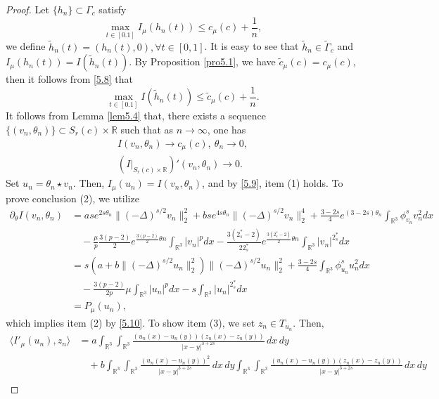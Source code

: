 \documentclass[reqno]{amsart}
\begin{document}
\begin{proof}
Let $\{h_n\}\subset \Gamma_c$ satisfy 
\begin{equation}\label{5.8}
\max_{t\in[0.1]}I_\mu(h_n(t))\leq {c}_\mu(c)+\frac{1}{n},
\end{equation}
we define $\tilde{h}_n(t)=(h_n(t) , 0), \forall t\in[0,1]$. 
It is easy to see that $\tilde{h}_n \in \tilde{\Gamma}_c$ and 
$I_\mu(h_n(t))=I(\tilde{h}_n(t))$. By Proposition \ref{pro5.1}, we have 
$\tilde{c}_\mu(c)={c}_\mu(c)$, then it follows from \eqref{5.8} that
\[  %
\max_{t\in[0.1]}I(\tilde{h}_n(t))\leq \tilde{c}_\mu(c)+\frac{1}{n}.
\]
It follows from Lemma \ref{lem5.4} that, there exists a sequence
$\{(v_n, \theta_n)\} \subset S_{r}(c)\times \mathbb{R}$ such that as $n\to \infty$,
one has
\begin{gather}\label{5.9}
I(v_n, \theta_n)\to c_\mu(c), ~\theta_n\to 0, \\
\label{5.10}
(I|_{S_{r}(c)\times{\mathbb{R}}})'(v_n, \theta_n)\to 0.
\end{gather}
Set $u_n=\theta_n \star  v_n$. Then, $I_\mu(u_n)=I(v_n, \theta_n)$,
and by \eqref{5.9}, item (1) holds.  To prove conclusion (2), we utilize
\begin{align*}%
\partial_\theta I(v_n, \theta_n)
&= ase^{2s\theta_n}\|(-\Delta)^{s/2}v_n\|^2_2+bse^{4s\theta_n}\|(-\Delta)^{s/2}v_n\|^4_2+\frac{3-2s}{4}e^{(3-2s)\theta_n}
\int_{\mathbb{R}^3}\phi^s_{v_n}{v^2_n}dx\\
&\quad -\frac{\mu}{p}\frac{3(p-2)}{2}e^{\frac{3(p-2)}{2}\theta n}\int_{\mathbb{R}^3}|v_n|^pdx-\frac{3(2^*_s-2)}{2 2^*_s}e^{\frac{3(2^*_s-2)}{2}\theta n}\int_{\mathbb{R}^3}|v_n|^{2^*_s}dx\\
&= s(a+b\|(-\Delta)^{s/2}u_n\|^2_2)\|(-\Delta)^{s/2}u_n\|^2_2+\frac{3-2s}{4}\int_{\mathbb{R}^3}\phi^s_{u_n}{u^2_n}dx\\
&\quad -\frac{3(p-2)}{2p}\mu \int_{\mathbb{R}^3}|u_n|^pdx-s\int_{\mathbb{R}^3}|u_n|^{2^*_s}dx\\
&= P_\mu(u_n),
\end{align*}
which implies item (2) by \eqref{5.10}. To show item (3), we set $z_n\in T_{u_n}$.
Then,
\begin{align*}%
\langle I'_\mu(u_n),z_n\rangle
&= a\int_{\mathbb{R}^3}\int_{\mathbb{R}^3}
 \frac{(u_n(x)-u_n(y))(z_n(x)-z_n(y))}{|x-y|^{3+2s}}\,dx\,dy\\
&\quad +b\int_{\mathbb{R}^3}\int_{\mathbb{R}^3}\frac{(u_n(x)
 -u_n(y))^2}{|x-y|^{3+2s}}\,dx\,dy
 \int_{\mathbb{R}^3}\int_{\mathbb{R}^3}
 \frac{(u_n(x)-u_n(y))(z_n(x)-z_n(y))}{|x-y|^{3+2s}}\,dx\,dy  \\

\end{align*}
\end{proof}
\end{document}
